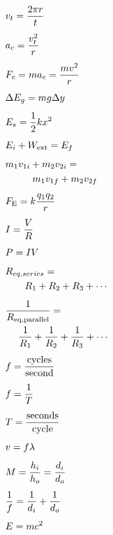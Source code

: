 \documentclass[dvipsnames]{article}
\begin{document}
\begin{multicols*}{4}
\columnbreak

\begin{align*}
    & v_t = \frac{2\pi r}{t} \\[1ex]
    & a_c = \frac{v_t^2}{r} \\[1ex]
    & F_c = m a_c = \frac{mv^2}{r} \\[1ex]
    & \Delta E_g = mg \Delta y \\[1ex]
    & E_s = \frac{1}{2} k x^2 \\[1ex]
    & E_i + W_\mathrm{ext} = E_f \\[1ex]
    & m_1 v_{1i} + m_2 v_{2i} = \\
    & \textcolor{white}{\qquad =} m_1 v_{1f} + m_2 v_{2f} \\[1ex]
    & F_\mathrm{E} = k \frac{q_1 q_2}{r} \\[1ex]
    & I = \frac{V}{R} \\[1ex]
    & P = IV \\[1ex]
    & R_{eq,series} = \\
    & \qquad R_1 + R_2 + R_3 + \cdots \\[1ex]
    &   \frac{1}{R_{\mathrm{eq,parallel}}} = \\
    & \quad\ \frac{1}{R_1} + \frac{1}{R_2} + \frac{1}{R_3} + \cdots \\[1ex]
    & f = \frac{\mathrm{cycles}}{\mathrm{second}} \\[1ex]
    & f = \frac{1}{T} \\[1ex]
    & T = \frac{\mathrm{seconds}}{\mathrm{cycle}} \\[1ex]
    & v = f \lambda \\[1ex]
    & M = \frac{h_i}{h_o} = \frac{d_i}{d_o} \\[1ex]
    & \frac{1}{f} = \frac{1}{d_i} + \frac{1}{d_o} \\[1ex]
    & E = mc^2
\end{align*}

\columnbreak


\end{multicols*}
\end{document}
